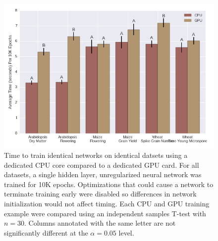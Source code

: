 
\begin{figure}[htbp]
\renewcommand{\familydefault}{\sfdefault}\normalfont
\centering 
\includegraphics[width=\linewidth]{g3_article/figures/time_comparison.png}
    \caption{Time to train identical networks on identical datsets using a dedicated CPU core
             compared to a dedicated GPU card. For all datasets, a single hidden layer, unregularized 
             neural network was trained for 10K epochs. Optimizations that could cause a network
             to terminate training early were disabled so differences in network initialization
             would not affect timing. Each CPU and GPU training example were compared using 
             an independent samples T-test with $n=30$. Columns annotated with the same letter 
             are not significantly different at the $\alpha=0.05$ level.}
\label{fig:time-comparison}
\end{figure}
